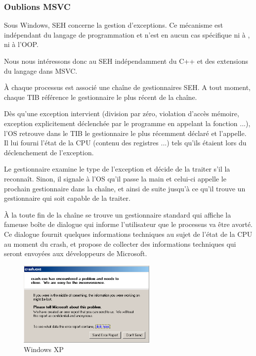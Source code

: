 \subsubsection{Oublions MSVC}

Sous Windows, \ac{SEH} concerne la gestion d'exceptions. Ce mécanisme est indépendant du langage
de programmation et n'est en aucun cas spécifique ni à \Cpp, ni à l'\ac{OOP}.

Nous nous intéressons donc au \ac{SEH} indépendamment du C++ et des extensions du langage dans MSVC.


À chaque processus est associé une chaîne de gestionnaires \ac{SEH}. A tout moment, chaque \ac{TIB}
référence le gestionnaire le plus récent de la chaîne.

Dès qu'une exception intervient (division par zéro, violation d'accès mémoire, exception explicitement
déclenchée par le programme en appelant la fonction  ...), l'OS retrouve dans le
\ac{TIB} le gestionnaire le plus récemment déclaré et l'appelle. Il lui fourni l'état de la \ac{CPU}
(contenu des registres ...) tels qu'ils étaient lors du déclenchement de l'exception.

Le gestionnaire examine le type de l'exception et décide de la traiter s'il la reconnaît. Sinon, il
signale à l'\ac{OS} qu'il passe la main et celui-ci appelle le prochain gestionnaire dans la chaîne,
et ainsi de suite jusqu'à ce qu'il trouve un gestionnaire qui soit capable de la traiter.

À la toute fin de la chaîne se trouve un gestionnaire standard qui affiche la fameuse boîte de
dialogue qui informe l'utilisateur que le processus va être avorté. Ce dialogue fournit quelques
informations techniques au sujet de l'état de la \ac{CPU} au moment du crash, et propose de collecter
des informations techniques qui seront envoyées aux développeurs de Microsoft.

\begin{figure}[H]
\centering
\includegraphics[width=0.6\textwidth]{OS/SEH/1/crash_xp1.png}
\caption{Windows XP}
\end{figure}

